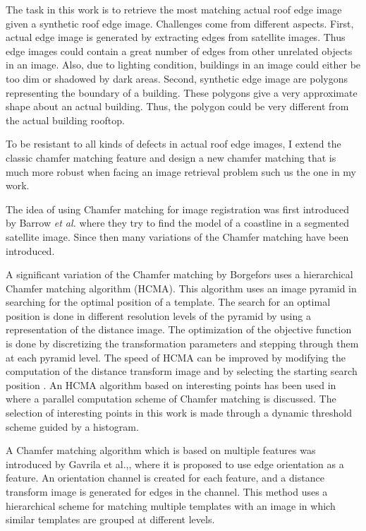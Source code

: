 \documentclass{iitthesis}
\begin{document}
The task in this work is to retrieve the most matching actual roof edge image given a synthetic roof edge image. Challenges come from different aspects. First, actual edge image is generated by extracting edges from satellite images. Thus edge images could contain a great number of edges from other unrelated objects in an image. Also, due to lighting condition, buildings in an image could either be too dim or shadowed by dark areas. Second, synthetic edge image are polygons representing the boundary of a building. These polygons give a very approximate shape about an actual building. Thus, the polygon could be very different from the actual building rooftop.

To be resistant to all kinds of defects in actual roof edge images, I extend the classic chamfer matching feature and design a new chamfer matching that is much more robust when facing an image retrieval problem such us the one in my work.

The idea of using Chamfer matching for image registration was first introduced by Barrow \textit{et al.} \cite{HB:77} where they try to find the model of a coastline in a segmented satellite image. Since then many variations of the Chamfer matching have been introduced.

A significant variation of the Chamfer matching by Borgefors \cite{GB:88} uses a hierarchical Chamfer matching algorithm (HCMA). This algorithm uses an image pyramid in searching for the optimal position of a template. The search for an optimal position is done in different resolution levels of the pyramid by using a representation of the distance image. The optimization of the objective function is done by discretizing the transformation parameters and stepping through them at each pyramid level. The speed of HCMA can be improved by modifying the computation of the distance transform image and by selecting the starting search position \cite{QZ:09}. An HCMA algorithm based on interesting points has been used in \cite{JY:95} where a parallel computation scheme of Chamfer matching is discussed. The selection of interesting points in this work is made through a dynamic threshold scheme guided by a histogram.

A Chamfer matching algorithm which is based on multiple features was introduced by Gavrila et al.\cite{DG:98},\cite{DG:99}, where it is proposed to use edge orientation as a feature. An orientation channel is created for each feature, and a distance transform image is generated for edges in the channel. This method uses a hierarchical scheme for matching multiple templates with an image in which similar templates are grouped at different levels.
\end{document}
